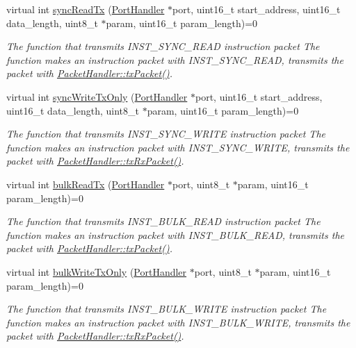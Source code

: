 \begin{DoxyCompactItemize}
virtual int \hyperlink{classmercury_1_1_packet_handler_af51ee95bfc3f386235e746b1418d5d38}{sync\+Read\+Tx} (\hyperlink{classmercury_1_1_port_handler}{Port\+Handler} $\ast$port, uint16\+\_\+t start\+\_\+address, uint16\+\_\+t data\+\_\+length, uint8\+\_\+t $\ast$param, uint16\+\_\+t param\+\_\+length)=0
\begin{DoxyCompactList}\small\item\em The function that transmits I\+N\+S\+T\+\_\+\+S\+Y\+N\+C\+\_\+\+R\+E\+AD instruction packet  The function makes an instruction packet with I\+N\+S\+T\+\_\+\+S\+Y\+N\+C\+\_\+\+R\+E\+AD,  transmits the packet with \hyperlink{classmercury_1_1_packet_handler_acc3f84f0d952dc2d827d8500de512abe}{Packet\+Handler\+::tx\+Packet()}. \end{DoxyCompactList}\item 
virtual int \hyperlink{classmercury_1_1_packet_handler_aa4c16ce358c78638f49f6dc1b5b141bd}{sync\+Write\+Tx\+Only} (\hyperlink{classmercury_1_1_port_handler}{Port\+Handler} $\ast$port, uint16\+\_\+t start\+\_\+address, uint16\+\_\+t data\+\_\+length, uint8\+\_\+t $\ast$param, uint16\+\_\+t param\+\_\+length)=0
\begin{DoxyCompactList}\small\item\em The function that transmits I\+N\+S\+T\+\_\+\+S\+Y\+N\+C\+\_\+\+W\+R\+I\+TE instruction packet  The function makes an instruction packet with I\+N\+S\+T\+\_\+\+S\+Y\+N\+C\+\_\+\+W\+R\+I\+TE,  transmits the packet with \hyperlink{classmercury_1_1_packet_handler_ac7ceeaec210827d119199144badaad3a}{Packet\+Handler\+::tx\+Rx\+Packet()}. \end{DoxyCompactList}\item 
virtual int \hyperlink{classmercury_1_1_packet_handler_a88c18487119394e45537098716cbf6af}{bulk\+Read\+Tx} (\hyperlink{classmercury_1_1_port_handler}{Port\+Handler} $\ast$port, uint8\+\_\+t $\ast$param, uint16\+\_\+t param\+\_\+length)=0
\begin{DoxyCompactList}\small\item\em The function that transmits I\+N\+S\+T\+\_\+\+B\+U\+L\+K\+\_\+\+R\+E\+AD instruction packet  The function makes an instruction packet with I\+N\+S\+T\+\_\+\+B\+U\+L\+K\+\_\+\+R\+E\+AD,  transmits the packet with \hyperlink{classmercury_1_1_packet_handler_acc3f84f0d952dc2d827d8500de512abe}{Packet\+Handler\+::tx\+Packet()}. \end{DoxyCompactList}\item 
virtual int \hyperlink{classmercury_1_1_packet_handler_a43bc93f4a1305ae3aea45f67404d8b6d}{bulk\+Write\+Tx\+Only} (\hyperlink{classmercury_1_1_port_handler}{Port\+Handler} $\ast$port, uint8\+\_\+t $\ast$param, uint16\+\_\+t param\+\_\+length)=0
\begin{DoxyCompactList}\small\item\em The function that transmits I\+N\+S\+T\+\_\+\+B\+U\+L\+K\+\_\+\+W\+R\+I\+TE instruction packet  The function makes an instruction packet with I\+N\+S\+T\+\_\+\+B\+U\+L\+K\+\_\+\+W\+R\+I\+TE,  transmits the packet with \hyperlink{classmercury_1_1_packet_handler_ac7ceeaec210827d119199144badaad3a}{Packet\+Handler\+::tx\+Rx\+Packet()}. \end{DoxyCompactList}\end{DoxyCompactItemize}
